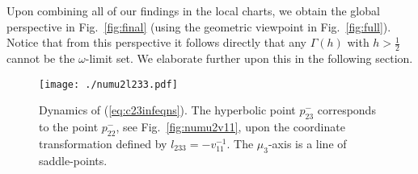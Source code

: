 \documentclass[reqno,12pt]{amsart}
\renewcommand{\eqref}[1]{(\ref{eq:#1})}
\newcommand{\figref}[1]{Fig.~\ref{fig:#1}}
\newcommand{\figlab}[1]{\label{fig:#1}}
\newtheorem{remark}[theorem]{Remark}
\numberwithin{equation}{section}
\begin{document}
Upon combining all of our findings in the local charts, we obtain the global perspective in \figref{final} (using the geometric viewpoint in \figref{full}). Notice that from this perspective it follows directly that any $\Gamma(h)$ with $h>\frac12$ cannot be the $\omega$-limit set. We elaborate further upon this in the following section. 
\begin{figure}[h!]
 	\begin{center}
 		{\texttt{[image: ./numu2l233.pdf]}}
 		\caption{Dynamics of \eqref{c23infeqns}. The hyperbolic point $p_{23}^-$ corresponds to the point $p_{22}^-$, see \figref{numu2v11}, upon the coordinate transformation defined by $l_{233}=-v_{11}^{-1}$. The $\mu_3$-axis is a line of saddle-points.}\figlab{numu2l233}
 	\end{center}
 \end{figure}
\end{document}
